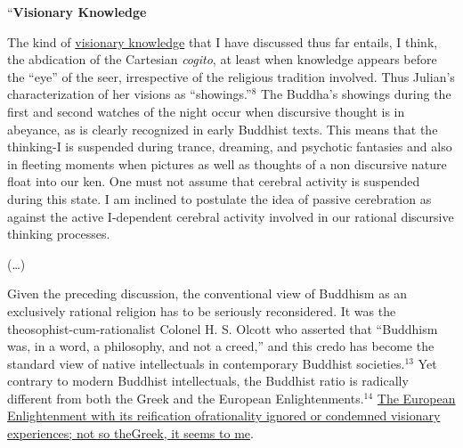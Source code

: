 \begin{myquote}
“\textbf{Visionary Knowledge}
\end{myquote}

\begin{myquote}
The kind of \underline{visionary knowledge} that I have discussed thus far entails, I think, the abdication of the Cartesian \textit{cogito}, at least when knowledge appears before the “eye” of the seer, irrespective of the religious tradition involved. Thus Julian’s characterization of her visions as “showings.”$^{8}$ The Buddha’s showings during the first and second watches of the night occur when discursive thought is in abeyance, as is clearly recognized in early Buddhist texts. This means that the thinking-I is suspended during trance, dreaming, and psychotic fantasies and also in ﬂeeting moments when pictures as well as thoughts of a non discursive nature ﬂoat into our ken. One must not assume that cerebral activity is suspended during this state. I am inclined to postulate the idea of passive cerebration as against the active I-dependent cerebral activity involved in our rational discursive thinking processes.
\end{myquote}

\begin{myquote}
(…)
\end{myquote}

\begin{myquote}
Given the preceding discussion, the conventional view of Buddhism as an exclusively rational religion has to be seriously reconsidered. It was the theosophist-cum-rationalist Colonel H. S. Olcott who asserted that “Buddhism was, in a word, a philosophy, and not a creed,” and this credo has become the standard view of native intellectuals in contemporary Buddhist societies.$^{13}$ Yet contrary to modern Buddhist intellectuals, the Buddhist ratio is radically different from both the Greek and the European Enlightenments.$^{14}$ \underline{The European Enlightenment with its reification of}\break \underline{rationality ignored or condemned visionary experiences; not so the}\break \underline{Greek, it seems to me}.
\end{myquote}

